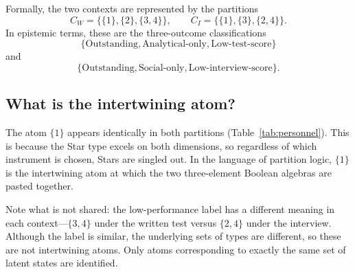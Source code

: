 \documentclass{article}
\begin{document}
Formally, the two contexts are represented by the partitions
\begin{equation}
C_W=\{\{1\},\{2\},\{3,4\}\},
\qquad
C_I=\{\{1\},\{3\},\{2,4\}\}.
\label{eq:personnel_contexts}
\end{equation}
In epistemic terms, these are the three-outcome classifications
\[
\{\text{Outstanding},\text{Analytical-only},\text{Low-test-score}\}
\]
and
\[
\{\text{Outstanding},\text{Social-only},\text{Low-interview-score}\}.
\]

\subsection{What is the intertwining atom?}

The atom $\{1\}$ appears identically in both partitions
(Table~\ref{tab:personnel}). This is because the Star type excels on
both dimensions, so regardless of which instrument is chosen, Stars
are singled out. In the language of partition logic, $\{1\}$ is the
intertwining atom at which the two three-element Boolean algebras are
pasted together.

Note what is not shared: the low-performance label has a different
meaning in each context---$\{3,4\}$ under the written test versus
$\{2,4\}$ under the interview. Although the label is similar, the
underlying sets of types are different, so these are not
intertwining atoms. Only atoms corresponding to exactly the same set
of latent states are identified.
\end{document}
